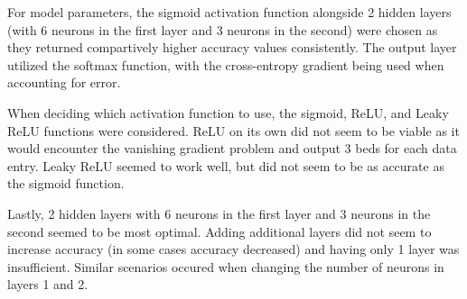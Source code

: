 \documentclass[12pt]{article}
\begin{document}
For model parameters, the sigmoid activation function alongside 2 hidden layers (with 6 neurons in the first layer and 3 neurons in the second) were chosen as they returned compartively higher accuracy values consistently. The output layer utilized the softmax function, with the cross-entropy gradient being used when accounting for error.

When deciding which activation function to use, the sigmoid, ReLU, and Leaky ReLU functions were considered. ReLU on its own did not seem to be viable as it would encounter the vanishing gradient problem and output 3 beds for each data entry. Leaky ReLU seemed to work well, but did not seem to be as accurate as the sigmoid function.

Lastly, 2 hidden layers with 6 neurons in the first layer and 3 neurons in the second seemed to be most optimal. Adding additional layers did not seem to increase accuracy (in some cases accuracy decreased) and having only 1 layer was insufficient. Similar scenarios occured when changing the number of neurons in layers 1 and 2.  
\end{document}

